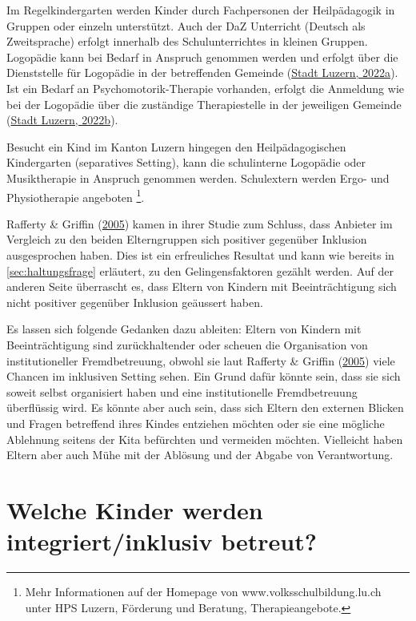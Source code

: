 \documentclass[
  ngerman,
  11pt,
  paper=a4,
  twoside,
  titlepage=true,
  openright,
  abstract=on,
  toc=listofnumbered,
  numbers=noenddot,
  chapterprefix=true,
  headings=optiontohead,
  svgnames,
  dvipsnames]{scrreprt}
\begin{document}
Im Regelkindergarten werden Kinder durch Fachpersonen der Heilpädagogik
in Gruppen oder einzeln unterstützt. Auch der DaZ Unterricht (Deutsch
als Zweitsprache) erfolgt innerhalb des Schulunterrichtes in kleinen
Gruppen. Logopädie kann bei Bedarf in Anspruch genommen werden und
erfolgt über die Dienststelle für Logopädie in der betreffenden Gemeinde
(\protect\hyperlink{ref-logopuxe4dieKantonLuzern}{Stadt Luzern, 2022a}).
Ist ein Bedarf an Psychomotorik-Therapie vorhanden, erfolgt die
Anmeldung wie bei der Logopädie über die zuständige Therapiestelle in
der jeweiligen Gemeinde (\protect\hyperlink{ref-psychomotorik}{Stadt
Luzern, 2022b}).

Besucht ein Kind im Kanton Luzern hingegen den Heilpädagogischen
Kindergarten (separatives Setting), kann die schulinterne Logopädie oder
Musiktherapie in Anspruch genommen werden. Schulextern werden Ergo- und
Physiotherapie angeboten \footnote{Mehr Informationen auf der Homepage
  von www.volksschulbildung.lu.ch unter HPS Luzern, Förderung und
  Beratung, Therapieangebote.}.

Rafferty \& Griffin
(\protect\hyperlink{ref-raffertyux5cux26Griffin2005}{2005}) kamen in
ihrer Studie zum Schluss, dass Anbieter im Vergleich zu den beiden
Elterngruppen sich positiver gegenüber Inklusion ausgesprochen haben.
Dies ist ein erfreuliches Resultat und kann wie bereits in
\cref{sec:haltungsfrage} erläutert, zu den Gelingensfaktoren gezählt
werden. Auf der anderen Seite überrascht es, dass Eltern von Kindern mit
Beeinträchtigung sich nicht positiver gegenüber Inklusion geäussert
haben.

Es lassen sich folgende Gedanken dazu ableiten: Eltern von Kindern mit
Beeinträchtigung sind zurückhaltender oder scheuen die Organisation von
institutioneller Fremdbetreuung, obwohl sie laut Rafferty \& Griffin
(\protect\hyperlink{ref-raffertyux5cux26Griffin2005}{2005}) viele
Chancen im inklusiven Setting sehen. Ein Grund dafür könnte sein, dass
sie sich soweit selbst organisiert haben und eine institutionelle
Fremdbetreuung überflüssig wird. Es könnte aber auch sein, dass sich
Eltern den externen Blicken und Fragen betreffend ihres Kindes entziehen
möchten oder sie eine mögliche Ablehnung seitens der Kita befürchten und
vermeiden möchten. Vielleicht haben Eltern aber auch Mühe mit der
Ablösung und der Abgabe von Verantwortung.

\hypertarget{sec:werintegriert}{%
\section{Welche Kinder werden integriert/inklusiv
betreut?}\label{sec:werintegriert}}
\end{document}
